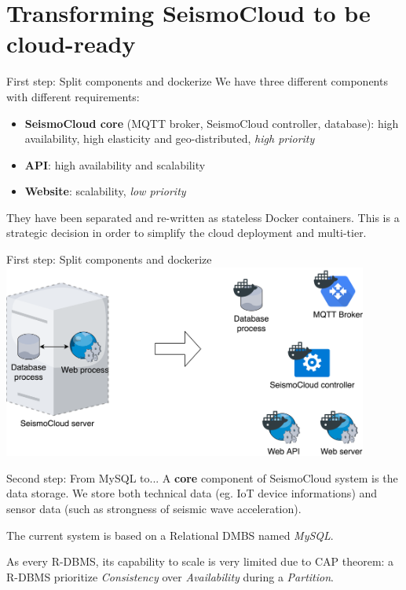
\section{Transforming SeismoCloud to be cloud-ready}

\begin{frame}{First step: Split components and dockerize}
We have three different components with different requirements:

\begin{itemize}
  \item \textbf{SeismoCloud core} (MQTT broker, SeismoCloud controller, database):
  high availability, high elasticity and geo-distributed, \textit{high priority}
  \item \textbf{API}: high availability and scalability
  \item \textbf{Website}: scalability, \textit{low priority}
\end{itemize}

They have been separated and re-written as stateless Docker containers. This is
a strategic decision in order to simplify the cloud deployment and multi-tier.
\end{frame}


\begin{frame}{First step: Split components and dockerize}
\centering
\includegraphics[width=0.9\textwidth]{scs-split-components}
\end{frame}


\begin{frame}{Second step: From MySQL to...}
A \textbf{core} component of SeismoCloud system is the data storage. We store
both technical data (eg. IoT device informations) and sensor data (such as
strongness of seismic wave acceleration).

The current system is based on a Relational DMBS named \textit{MySQL}.

As every R-DBMS, its capability to scale is very limited due to CAP theorem: a
R-DBMS prioritize \textit{Consistency} over \textit{Availability} during a
\textit{Partition}.
\end{frame}


